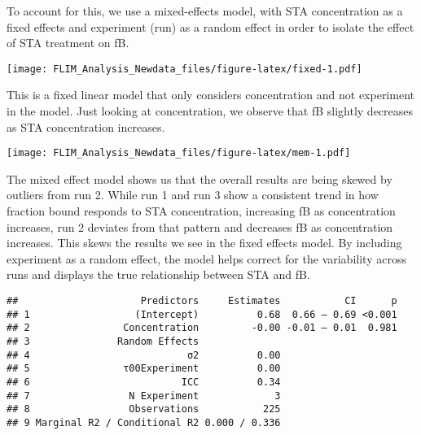 \documentclass[
]{article}
\begin{document}
To account for this, we use a mixed-effects model, with STA
concentration as a fixed effects and experiment (run) as a random effect
in order to isolate the effect of STA treatment on fB.

\texttt{[image: FLIM\_Analysis\_Newdata\_files/figure-latex/fixed-1.pdf]}

This is a fixed linear model that only considers concentration and not
experiment in the model. Just looking at concentration, we observe that
fB slightly decreases as STA concentration increases.

\texttt{[image: FLIM\_Analysis\_Newdata\_files/figure-latex/mem-1.pdf]}

The mixed effect model shows us that the overall results are being
skewed by outliers from run 2. While run 1 and run 3 show a consistent
trend in how fraction bound responds to STA concentration, increasing fB
as concentration increases, run 2 deviates from that pattern and
decreases fB as concentration increases. This skews the results we see
in the fixed effects model. By including experiment as a random effect,
the model helps correct for the variability across runs and displays the
true relationship between STA and fB.

\begin{verbatim}
##                     Predictors     Estimates           CI      p
## 1                  (Intercept)          0.68  0.66 – 0.69 <0.001
## 2                Concentration         -0.00 -0.01 – 0.01  0.981
## 3               Random Effects                                  
## 4                           σ2          0.00                    
## 5                τ00Experiment          0.00                    
## 6                          ICC          0.34                    
## 7                 N Experiment             3                    
## 8                 Observations           225                    
## 9 Marginal R2 / Conditional R2 0.000 / 0.336
\end{verbatim}
\end{document}
